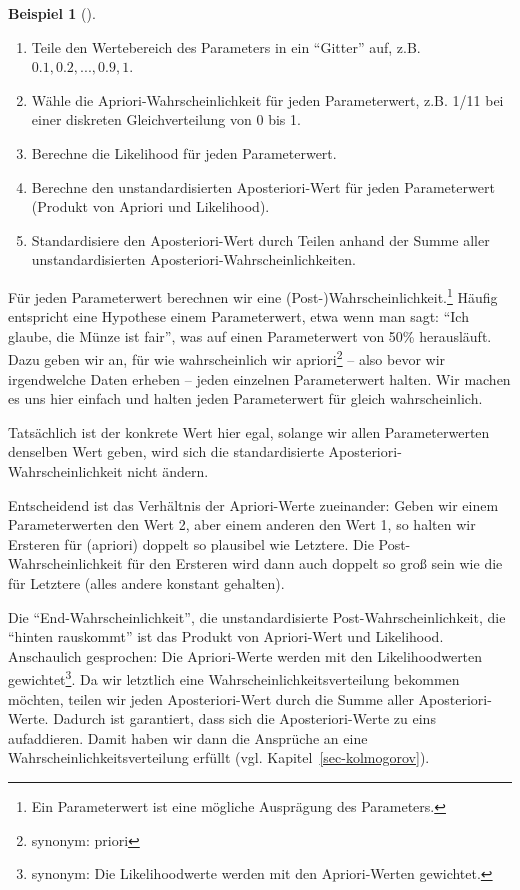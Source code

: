 \documentclass[
  ngerman,
  letterpaper,
  twoside,
  open=any]{scrbook}
\providecommand{\tightlist}{%
  \setlength{\itemsep}{0pt}\setlength{\parskip}{0pt}}\usepackage{longtable,booktabs,array}
\theoremstyle{definition}
\newtheorem{example}{Beispiel}[chapter]
\theoremstyle{plain}
\theoremstyle{definition}
\theoremstyle{definition}
\theoremstyle{remark}
\begin{document}
\begin{example}[]
\begin{enumerate}
\def\labelenumi{\arabic{enumi}.}
\tightlist
\item
  Teile den Wertebereich des Parameters in ein \enquote{Gitter} auf,
  z.B. \(0.1, 0.2, ..., 0.9, 1\).
\item
  Wähle die Apriori-Wahrscheinlichkeit für jeden Parameterwert, z.B.
  1/11 bei einer diskreten Gleichverteilung von 0 bis 1.
\item
  Berechne die Likelihood für jeden Parameterwert.
\item
  Berechne den unstandardisierten Aposteriori-Wert für jeden
  Parameterwert (Produkt von Apriori und Likelihood).
\item
  Standardisiere den Aposteriori-Wert durch Teilen anhand der Summe
  aller unstandardisierten Aposteriori-Wahrscheinlichkeiten.
\end{enumerate}

Für jeden Parameterwert berechnen wir eine
(Post-)Wahrscheinlichkeit.\footnote{Ein Parameterwert ist eine mögliche
  Ausprägung des Parameters.} Häufig entspricht eine Hypothese einem
Parameterwert, etwa wenn man sagt: \enquote{Ich glaube, die Münze ist
fair}, was auf einen Parameterwert von 50\% herausläuft. Dazu geben wir
an, für wie wahrscheinlich wir apriori\footnote{synonym: priori} -- also
bevor wir irgendwelche Daten erheben -- jeden einzelnen Parameterwert
halten. Wir machen es uns hier einfach und halten jeden Parameterwert
für gleich wahrscheinlich.

Tatsächlich ist der konkrete Wert hier egal, solange wir allen
Parameterwerten denselben Wert geben, wird sich die standardisierte
Aposteriori-Wahrscheinlichkeit nicht ändern.

Entscheidend ist das Verhältnis der Apriori-Werte zueinander: Geben wir
einem Parameterwerten den Wert 2, aber einem anderen den Wert 1, so
halten wir Ersteren für (apriori) doppelt so plausibel wie Letztere. Die
Post-Wahrscheinlichkeit für den Ersteren wird dann auch doppelt so groß
sein wie die für Letztere (alles andere konstant gehalten).

Die \enquote{End-Wahrscheinlichkeit}, die unstandardisierte
Post-Wahrscheinlichkeit, die \enquote{hinten rauskommt} ist das Produkt
von Apriori-Wert und Likelihood. Anschaulich gesprochen: Die
Apriori-Werte werden mit den Likelihoodwerten gewichtet\footnote{synonym:
  Die Likelihoodwerte werden mit den Apriori-Werten gewichtet.}. Da wir
letztlich eine Wahrscheinlichkeitsverteilung bekommen möchten, teilen
wir jeden Aposteriori-Wert durch die Summe aller Aposteriori-Werte.
Dadurch ist garantiert, dass sich die Aposteriori-Werte zu eins
aufaddieren. Damit haben wir dann die Ansprüche an eine
Wahrscheinlichkeitsverteilung erfüllt (vgl.
Kapitel~\ref{sec-kolmogorov}).


\end{example}
\end{document}
